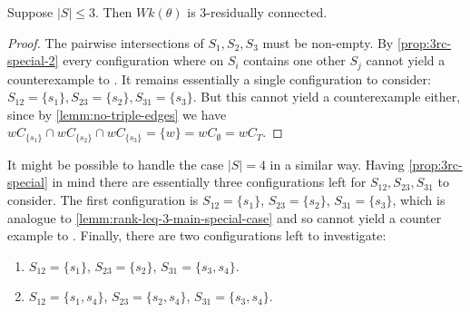 \begin{lemm}
	Suppose $|S| \leq 3$. Then $Wk(\theta)$ is 3-residually connected.

	\begin{proof}
		The pairwise intersections of $S_1,S_2,S_3$ must be non-empty. By \ref{prop:3rc-special-2} every configuration where on $S_i$ contains one other $S_j$ cannot yield a counterexample to . It remains essentially a single configuration to consider: $S_{12} = \{s_1\}, S_{23} = \{s_2\}, S_{31} = \{s_3\}$. But this cannot yield a counterexample either, since by \ref{lemm:no-triple-edges} we have $w C_{\{s_1\}} \cap w C_{\{s_2\}} \cap w C_{\{s_3\}} = \{ w \} = w C_\emptyset = w C_T$.
	\end{proof}
\end{lemm}

\begin{rema}
	It might be possible to handle the case $|S| = 4$ in a similar way. Having \ref{prop:3rc-special} in mind there are essentially three configurations left for $S_{12},S_{23},S_{31}$ to consider. The first configuration is $S_{12} = \{s_1\}$, $S_{23} = \{s_2\}$, $S_{31} = \{s_3\}$, which is analogue to \ref{lemm:rank-leq-3-main-special-case} and so cannot yield a counter example to . Finally, there are two configurations left to investigate:
	\begin{enumerate}
		\item $S_{12} = \{s_1\}$, $S_{23} = \{s_2\}$, $S_{31} = \{s_3,s_4\}$.
		\item $S_{12} = \{s_1,s_4\}$, $S_{23} = \{s_2,s_4\}$, $S_{31} = \{s_3,s_4\}$.
	\end{enumerate}
\end{rema}

